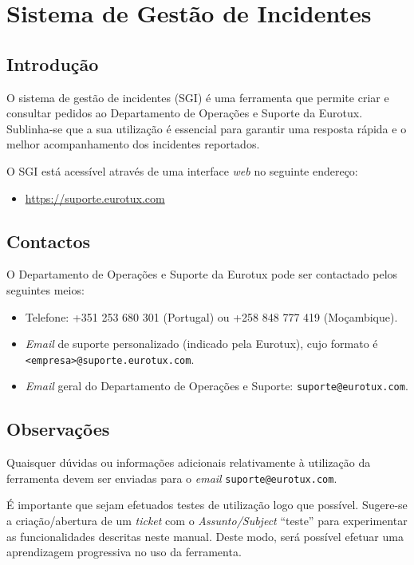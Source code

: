 \def\directorynameimg{./include/img}
\chapter{Sistema de Gestão de Incidentes}
\section{Introdução}
O sistema de gestão de incidentes (SGI) é uma ferramenta que permite criar e consultar pedidos ao Departamento de Operações e Suporte da Eurotux.
Sublinha-se que a sua utilização é essencial para garantir uma resposta rápida e o melhor acompanhamento dos incidentes reportados. 

O SGI está acessível através de uma interface \textit{web} no seguinte endereço:
\begin{itemize}
	\item \url{https://suporte.eurotux.com}
\end{itemize}

\section{Contactos}\label{sgi:contactos}
O Departamento de Operações e Suporte da Eurotux pode ser contactado pelos seguintes meios:
\begin{itemize}
\item Telefone: +351 253 680 301 (Portugal) ou +258 848 777 419 (Moçambique).
\item \textit{Email} de suporte personalizado (indicado pela Eurotux), cujo formato é \\ \texttt{<empresa>@suporte.eurotux.com}.
\item \textit{Email} geral do Departamento de Operações e Suporte: \texttt{suporte@eurotux.com}.
\end{itemize}

\section{Observações}
Quaisquer dúvidas ou informações adicionais relativamente à utilização da ferramenta devem ser enviadas para o \emph{email} \texttt{suporte@eurotux.com}.

É importante que sejam efetuados testes de utilização logo que possível. Sugere-se a criação/abertura de um \emph{\textit{ticket}} com o \emph{Assunto/\textit{Subject}} ``teste'' para experimentar as funcionalidades descritas neste manual. Deste modo, será possível efetuar uma aprendizagem progressiva no uso da ferramenta.

